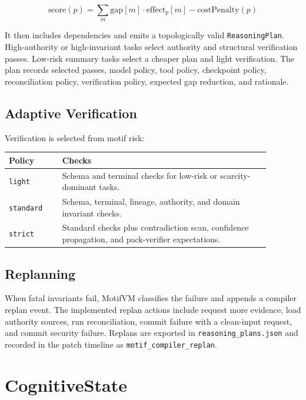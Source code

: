 \documentclass[11pt]{article}
\begin{document}
\[
\text{score}(p) =
\sum_m \text{gap}[m] \cdot \text{effect}_p[m]
- \text{costPenalty}(p)
\]

It then includes dependencies and emits a topologically valid \texttt{ReasoningPlan}. High-authority or high-invariant tasks select authority and structural verification passes. Low-risk summary tasks select a cheaper plan and light verification. The plan records selected passes, model policy, tool policy, checkpoint policy, reconciliation policy, verification policy, expected gap reduction, and rationale.

\subsection{Adaptive Verification}

Verification is selected from motif risk:

\begin{center}
\begin{tabular}{p{0.18\linewidth}p{0.7\linewidth}}
\toprule
\textbf{Policy} & \textbf{Checks} \\
\midrule
\texttt{light} & Schema and terminal checks for low-risk or scarcity-dominant tasks. \\
\texttt{standard} & Schema, terminal, lineage, authority, and domain invariant checks. \\
\texttt{strict} & Standard checks plus contradiction scan, confidence propagation, and pack-verifier expectations. \\
\bottomrule
\end{tabular}
\end{center}

\subsection{Replanning}

When fatal invariants fail, MotifVM classifies the failure and appends a compiler replan event. The implemented replan actions include request more evidence, load authority sources, run reconciliation, commit failure with a clean-input request, and commit security failure. Replans are exported in \texttt{reasoning\_plans.json} and recorded in the patch timeline as \texttt{motif\_compiler\_replan}.

\section{CognitiveState}
\end{document}
